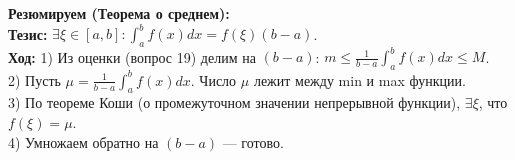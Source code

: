\begin{tcolorbox}[colback=gray!5, colframe=black, boxrule=0.5pt, arc=0pt]
\textbf{Резюмируем (Теорема о среднем):} \\
\textbf{Тезис:} $\exists \xi \in [a,b]: \int_a^b f(x) dx = f(\xi)(b-a)$. \\
\textbf{Ход:} 1) Из оценки (вопрос 19) делим на $(b-a)$: $m \le \frac{1}{b-a} \int_a^b f(x) dx \le M$. \\
2) Пусть $\mu = \frac{1}{b-a} \int_a^b f(x) dx$. Число $\mu$ лежит между min и max функции. \\
3) По теореме Коши (о промежуточном значении непрерывной функции), $\exists \xi$, что $f(\xi) = \mu$. \\
4) Умножаем обратно на $(b-a)$ — готово.
\end{tcolorbox}